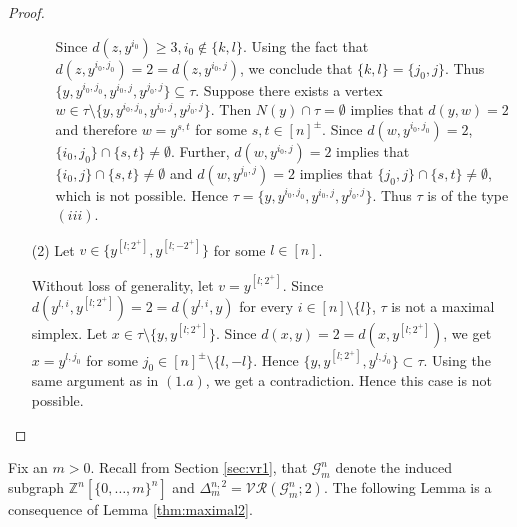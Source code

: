 \documentclass{amsart}
\theoremstyle{definition}
\theoremstyle{remark}
\numberwithin{equation}{section}
\newcommand{\vr}[2]{\mathcal{VR}(#1;#2)}
\def\Z{{\mathbb{Z}}}
\begin{document}
\begin{proof}
\begin{itemize}
\begin{itemize}
			
			Since $d(z, y^{i_0}) \geq 3, i_0 \notin \{k, l\}$. Using the fact that $d(z, y^{i_0, j_0}) = 2 = d(z, y^{i_0, j})$, we conclude that $\{k, l\} = \{j_0, j\}$. Thus $\{y, y^{i_0, j_0}, y^{i_0, j}, y^{j_0, j}\} \subseteq \tau.$  Suppose there exists a vertex $w \in \tau \setminus \{y, y^{i_0, j_0}, y^{i_0, j}, y^{j_0, j}\}$.  Then $N(y) \cap \tau = \emptyset $ implies that $d(y, w) = 2$ and therefore  $w = y^{s, t}$ for some $s, t \in [n]^{\pm}$. Since $d(w, y^{i_0, j_0}) = 2$, $\{i_0, j_0\} \cap \{s, t\} \neq \emptyset$. Further, $d(w, y^{i_0, j}) = 2$ implies  that $\{i_0, j\} \cap \{s, t\} \neq \emptyset$ and $d(w, y^{j_0, j}) = 2$ implies  that  $\{ j_0, j\} \cap \{s, t\} \neq \emptyset$, which is not possible. Hence $\tau = \{y, y^{i_0, j_0}, y^{i_0, j}, y^{j_0, j}\}$. Thus  $\tau$ is of the type $(iii)$.
			
		\end{itemize}
		
		\vspace{.35cm}
		
		\item[(2)] Let $v \in \{y^{[l; 2^+]}, y^{[l; -2^+]}\}$ for some $l \in [n]$. 
        
        Without loss of generality, let $v = y^{[l; 2^+]}$. Since $d(y^{l, i}, y^{[l; 2^+]}) = 2 = d(y^{l, i}, y)$ for every $i \in [n] \setminus \{l\}$,  $\tau$ is not a maximal simplex. Let $x \in \tau \setminus \{y, y^{[l; 2^+]}\}$. Since $d(x, y) = 2 = d(x, y^{[l; 2^+]})$, we  get $x = y^{l, j_0}$ for some $j_0\in [n]^{\pm} \setminus \{l, -l\}$.  Hence $\{y, y^{[l; 2^+]}, y^{l, j_0}\} \subset \tau$. Using the same argument as in $(1.a)$, we get a contradiction. Hence this case is not possible. 
	\end{itemize}
    \vspace{-0.4 cm}
\end{proof}

Fix an $m > 0$. Recall from Section \ref{sec:vr1}, that  $\mathcal{G}_m^n$ denote the induced  subgraph $\Z^n[\{0, \ldots, m\}^n]$ and   $\Delta_m^{n,2} = \vr{\mathcal{G}_m^n}{2}$. 
The following Lemma is a consequence of Lemma \ref{thm:maximal2}.
\end{document}
